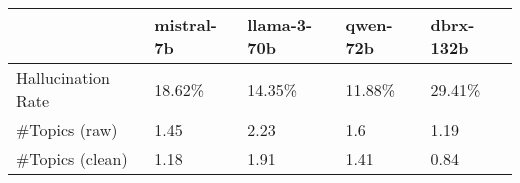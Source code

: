 \begin{tabular}{lllll}
\toprule
 & mistral-7b & llama-3-70b & qwen-72b & dbrx-132b \\
\midrule
Hallucination Rate & 18.62\% & 14.35\% & 11.88\% & 29.41\% \\
\#Topics (raw) & 1.45 & 2.23 & 1.6 & 1.19 \\
\#Topics (clean) & 1.18 & 1.91 & 1.41 & 0.84 \\
\bottomrule
\end{tabular}
